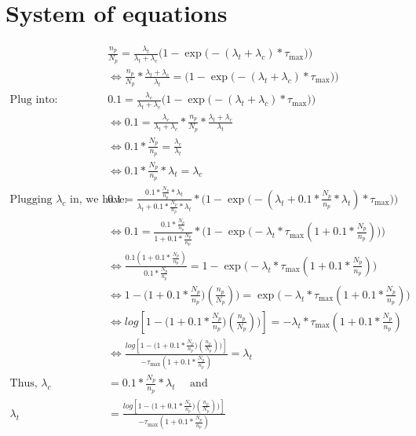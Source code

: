 \documentclass[10pt, letter]{article}
\begin{document}
\section{System of equations}
\begin{align*}
&\frac{n_p}{N_p} = \frac{\lambda_t}{\lambda_t + \lambda_c} \Big( 1 -  \exp\big(-(\lambda_t + \lambda_c)*\tau_\mathrm{max}\big)\Big)\\
&\iff \frac{n_p}{N_p}*\frac{\lambda_t + \lambda_c}{\lambda_t} = \Big( 1 -  \exp\big(-(\lambda_t + \lambda_c)*\tau_\mathrm{max}\big)\Big)\\
\text{Plug into: } &0.1 = \frac{\lambda_c}{\lambda_t + \lambda_c} \Big( 1 - \exp\big(-(\lambda_t + \lambda_c)*\tau_\mathrm{max}\big)\Big)\\
&\iff 0.1 = \frac{\lambda_c}{\lambda_t + \lambda_c} *  \frac{n_p}{N_p}*\frac{\lambda_t + \lambda_c}{\lambda_t}\\
&\iff 0.1*\frac{N_p}{n_p} = \frac{\lambda_c}{\lambda_t}\\
&\iff  0.1*\frac{N_p}{n_p}*\lambda_t = \lambda_c\\
\text{Plugging } \lambda_c \text{ in, we have: } &0.1 = \frac{0.1*\frac{N_p}{n_p}*\lambda_t}{\lambda_t + 0.1*\frac{N_p}{n_p}*\lambda_t}*\Big( 1 - \exp\big(-(\lambda_t + 0.1*\frac{N_p}{n_p}*\lambda_t)*\tau_\mathrm{max}\big)\Big)\\
&\iff 0.1 = \frac{0.1*\frac{N_p}{n_p}}{1 + 0.1*\frac{N_p}{n_p}}*\Big( 1 - \exp\big(-\lambda_t*\tau_\mathrm{max}(1 + 0.1*\frac{N_p}{n_p})\big)\Big)\\
&\iff \frac{0.1(1 + 0.1*\frac{N_p}{n_p})}{0.1*\frac{N_p}{n_p}} = 1 - \exp\big(-\lambda_t*\tau_\mathrm{max}(1 + 0.1*\frac{N_p}{n_p})\big)\\
&\iff 1 - \big(1 + 0.1*\frac{N_p}{n_p})(\frac{n_p}{N_p})\big) = \exp\big(-\lambda_t*\tau_\mathrm{max}(1 + 0.1*\frac{N_p}{n_p})\big)\\
&\iff log[1 - \big(1 + 0.1*\frac{N_p}{n_p})(\frac{n_p}{N_p})\big)] = -\lambda_t*\tau_\mathrm{max}(1 + 0.1*\frac{N_p}{n_p})\\
&\iff \frac{ log[1 - \big(1 + 0.1*\frac{N_p}{n_p})(\frac{n_p}{N_p})\big)]}{-\tau_\mathrm{max}(1 + 0.1*\frac{N_p}{n_p})} = \lambda_t\\
\text{Thus, } \lambda_c &=  0.1*\frac{N_p}{n_p}*\lambda_t \quad \text{ and }\\
\lambda_t &= \frac{ log[1 - \big(1 + 0.1*\frac{N_p}{n_p})(\frac{n_p}{N_p})\big)]}{-\tau_\mathrm{max}(1 + 0.1*\frac{N_p}{n_p})}\\
\end{align*}
\end{document}
